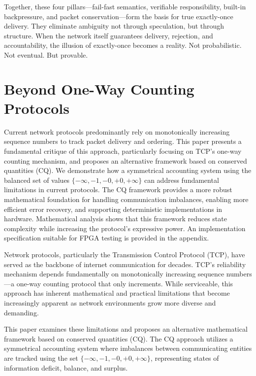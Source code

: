 \documentclass[../OAE-SPEC-MAIN.tex]{subfiles}
\begin{document}
Together, these four pillars—fail-fast semantics, verifiable responsibility, built-in backpressure, and packet conservation—form the basis for true exactly-once delivery. They eliminate ambiguity not through speculation, but through structure. When the network itself guarantees delivery, rejection, and accountability, the illusion of exactly-once becomes a reality. Not probabilistic. Not eventual. But provable.







\section{Beyond One-Way Counting Protocols}
Current network protocols predominantly rely on monotonically increasing sequence numbers to track packet delivery and ordering. This paper presents a fundamental critique of this approach, particularly focusing on TCP's one-way counting mechanism, and proposes an alternative framework based on conserved quantities (CQ). We demonstrate how a symmetrical accounting system using the balanced set of values $\{-\infty, -1, -0, +0, +\infty\}$ can address fundamental limitations in current protocols. The CQ framework provides a more robust mathematical foundation for handling communication imbalances, enabling more efficient error recovery, and supporting deterministic implementations in hardware. Mathematical analysis shows that this framework reduces state complexity while increasing the protocol's expressive power. An implementation specification suitable for FPGA testing is provided in the appendix.

Network protocols, particularly the Transmission Control Protocol (TCP), have served as the backbone of internet communication for decades. TCP's reliability mechanism depends fundamentally on monotonically increasing sequence numbers—a one-way counting protocol that only increments. While serviceable, this approach has inherent mathematical and practical limitations that become increasingly apparent as network environments grow more diverse and demanding.

This paper examines these limitations and proposes an alternative mathematical framework based on conserved quantities (CQ). The CQ approach utilizes a symmetrical accounting system where imbalances between communicating entities are tracked using the set $\{-\infty, -1, -0, +0, +\infty\}$, representing states of information deficit, balance, and surplus.
\end{document}
